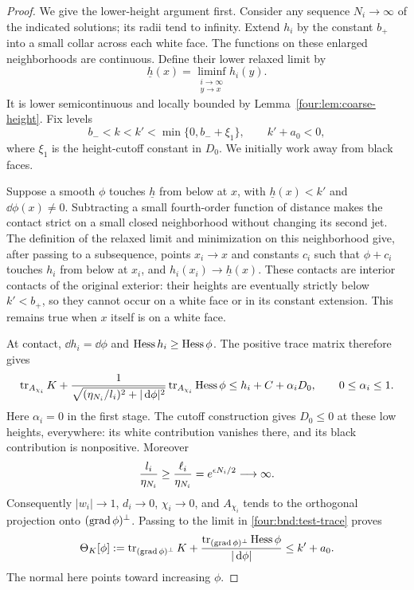 \begin{proof}
We give the lower-height argument first.  Consider any sequence
$N_i\to\infty$ of the indicated solutions; its radii tend to infinity.
Extend $h_i$ by the constant $b_+$ into a small collar across each white
face.  The functions on these enlarged neighborhoods are continuous.
Define their lower relaxed limit by
\[
 \underline h(x)=\liminf_{\substack{i\to\infty\\y\to x}}h_i(y).
\]
It is lower semicontinuous and locally bounded by
Lemma~\ref{four:lem:coarse-height}.  Fix levels
\begin{equation}\label{four:bnd:levels}
 b_-<k<k'<\min\{0,b_-+\xi_1\},\qquad k'+a_0<0,
\end{equation}
where $\xi_1$ is the height-cutoff constant in $D_0$.
We initially work away from black faces.

Suppose a smooth $\phi$ touches $\underline h$ from below at $x$,
with $\underline h(x)<k'$ and $\dd\phi(x)\ne0$.  Subtracting a small
fourth-order function of distance makes the contact strict on a
small closed neighborhood without changing its second jet.  The
definition of the relaxed limit and minimization on this neighborhood
give, after passing to a subsequence, points $x_i\to x$ and constants $c_i$ such that $\phi+c_i$
touches $h_i$ from below at $x_i$, and
$h_i(x_i)\to\underline h(x)$.  These contacts are interior contacts of
the original exterior: their heights are eventually strictly below
$k'<b_+$, so they cannot occur on a white face or in its constant
extension.  This remains true when $x$ itself is on a white face.

At contact, $\dd h_i=\dd\phi$ and
$\operatorname{Hess} h_i\ge\operatorname{Hess}\phi$.  The positive trace matrix therefore gives
\begin{equation}\label{four:bnd:test-trace}
 \operatorname{tr}_{A_{\chi_i}}K+
 \frac{1}{\sqrt{(\eta_{N_i}/l_i)^2+|\,\mathrm d\phi|^2}}
       \operatorname{tr}_{A_{\chi_i}}\operatorname{Hess}\phi
 \le h_i+C+\alpha_iD_0,
 \qquad 0\le\alpha_i\le1.
\end{equation}
Here $\alpha_i=0$ in the first stage.  The cutoff construction gives
$D_0\le0$ at these low heights, everywhere: its white contribution
vanishes there, and its black contribution is nonpositive.  Moreover
\[
 \frac{l_i}{\eta_{N_i}}\ge
 \frac{\ell_i}{\eta_{N_i}}=e^{\epsilon N_i/2}\longrightarrow\infty.
\]
Consequently $|w_i|\to1$, $d_i\to0$, $\chi_i\to0$,
and $A_{\chi_i}$ tends to the orthogonal projection onto
$(\operatorname{grad}\phi)^\perp$.  Passing to the
limit in \eqref{four:bnd:test-trace} proves
\begin{equation}\label{four:bnd:limiting-expansion}
 \Theta_K[\phi]:=
 \operatorname{tr}_{(\operatorname{grad}\phi)^\perp}K+
 \frac{\operatorname{tr}_{(\operatorname{grad}\phi)^\perp}\operatorname{Hess}\phi}{|\,\mathrm d\phi|}
 \le k'+a_0.
\end{equation}
The normal here points toward increasing $\phi$.


\end{proof}
